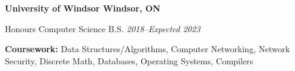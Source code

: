 \textbf{University of Windsor \hfill Windsor, ON} \par
Honours Computer Science B.S. \hfill \textit{2018--Expected 2023}\par
\textbf{Coursework:} Data Structures/Algorithms, Computer Networking, Network Security, Discrete Math, Databases, Operating Systems, Compilers\par
